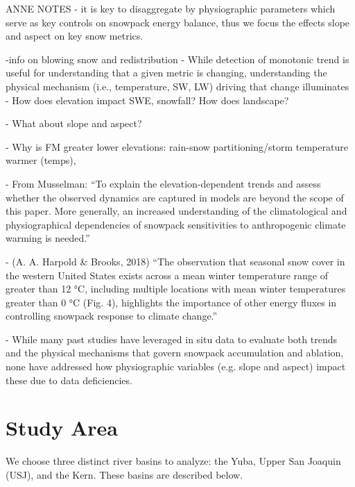 ANNE NOTES
- it is key to disaggregate by physiographic parameters which serve as key controls on snowpack energy balance, thus we focus the effects slope and aspect on key snow metrics. \

-info on blowing snow and redistribution
- While detection of monotonic trend is useful for understanding that a given metric is changing, understanding the physical mechanism (i.e., temperature, SW, LW) driving that change illuminates 
-	How does elevation impact SWE, snowfall? How does landscape? \

-	What about slope and aspect? \citep{dozierRevisitingTopographicHorizons2022, dozierApproachEnergyBalance1979} \

-	Why is FM greater lower elevations: rain-snow partitioning/storm temperature \citep{huWidespreadWarmingTrends2020} warmer (temps), \

-	From Musselman: “To explain the elevation-dependent trends and assess whether the observed dynamics are captured in models are beyond the scope of this paper. More generally, an increased understanding of the climatological and physiographical dependencies of snowpack sensitivities to anthropogenic climate warming is needed.” \

-	(A. A. Harpold \& Brooks, 2018) “The observation that seasonal snow cover in the western United States exists across a mean winter temperature range of greater than 12 °C, including multiple locations with mean winter temperatures greater than 0 °C (Fig. 4), highlights the importance of other energy fluxes in controlling snowpack response to climate change.” \

-	While many past studies have leveraged in situ data to evaluate both trends and the physical mechanisms that govern snowpack accumulation and ablation, none have addressed how physiographic variables (e.g. slope and aspect) impact these due to data deficiencies. \

 

\hypertarget{ch2-sa}{\section{Study Area}\label{ch2-sa}}

We choose three distinct river basins to analyze: the Yuba, Upper San Joaquin (USJ), and the Kern. These basins are described below.

